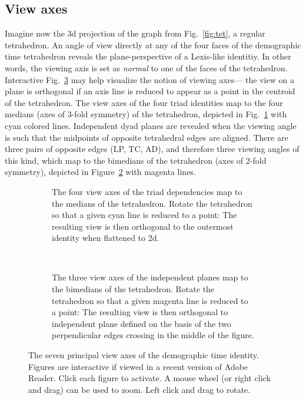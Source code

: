 \subsection{View axes}
\label{sec:viewaxes}
Imagine now the 3d projection of the graph from Fig.~\ref{fig:tet}, a regular tetrahedron. An angle of view directly at any of the four faces of the demographic time tetrahedron reveals the plane-perspective of a Lexis-like identitiy. In other words, the viewing axis is set as \emph{normal} to one of the faces of the tetrahedron. Interactive Fig.~\ref{fig:viewaxes} may help visualize the notion of viewing axes--- the view on a plane is orthogonal if an axis line is reduced to appear as a point in the centroid of the tetrahedron. The view axes of the four triad identities map to the four medians (axes of 3-fold symmetry) of the tetrahedron, depicted in
Fig.~\ref{fig:depviewaxes} with cyan colored lines. Independent dyad planes are revealed when the viewing angle is such that the midpoints of opposite tetrahedral edges are aligned. There are three pairs of opposite edges (LP, TC, AD), and therefore three viewing angles of this kind, which map to the bimedians of the tetrahedron (axes of 2-fold symmetry), depicted in Figure~\ref{fig:indepviewaxes} with magenta lines.
\begin{figure}
\begin{subfigure}[t]{0.45\linewidth}
    \centering
    
    \caption{The four view axes of the triad dependencies map to the medians of the tetrahedron. Rotate the tetrahedron so that a given cyan line is reduced to a point: The resulting view is then orthogonal to the outermost identity when flattened to 2d.}
    \label{fig:depviewaxes}
\end{subfigure}
~~
\begin{subfigure}[t]{0.45\linewidth}
    
    \caption{The three view axes of the independent planes map to the bimedians of the tetrahedron. Rotate the tetrahedron so that a given magenta line is reduced to a point: The resulting view is then orthogonal to independent plane defined on the basis of the two perpendicular edges crossing in the middle of the figure.}
    \label{fig:indepviewaxes}       
\end{subfigure}
\caption{The seven principal view axes of the demographic time identity. Figures are interactive if viewed in a recent version of Adobe Reader. Click each figure to activate. A mouse wheel (or right click and drag) can be used to zoom. Left click and drag to rotate.}
\label{fig:viewaxes}
\end{figure}

